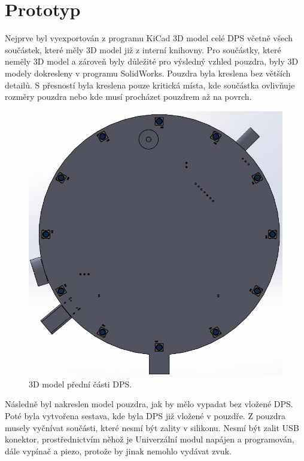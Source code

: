 \section{Prototyp}
Nejprve byl vyexportován z programu KiCad 3D model celé DPS včetně všech součástek, které měly 3D model již z interní knihovny. Pro součástky, které neměly 3D model a zároveň byly důležité 
pro výsledný vzhled pouzdra, byly 3D modely dokresleny v programu SolidWorks. Pouzdra byla kreslena bez větších detailů. S přesností byla kreslena pouze kritická místa, kde součástka ovlivňuje 
rozměry pouzdra nebo kde musí procházet pouzdrem až na povrch.
  
\begin{figure}[!h]
  \begin{center}
    \includegraphics[scale=0.4]{obrazky/3D_model_predni.jpg}
  \end{center}
  \caption[3D model přední části DPS]{3D model přední části DPS.}
\end{figure}

Následně byl nakreslen model pouzdra, jak by mělo vypadat bez vložené DPS. Poté byla vytvořena sestava, kde byla DPS již vložené v pouzdře. Z pouzdra musely vyčnívat součásti, které nesmí být 
zality v silikonu. Nesmí být zalit USB konektor, prostřednictvím něhož je Univerzální modul napájen a programován, dále vypínač a piezo, protože by jinak nemohlo vydávat zvuk. 


